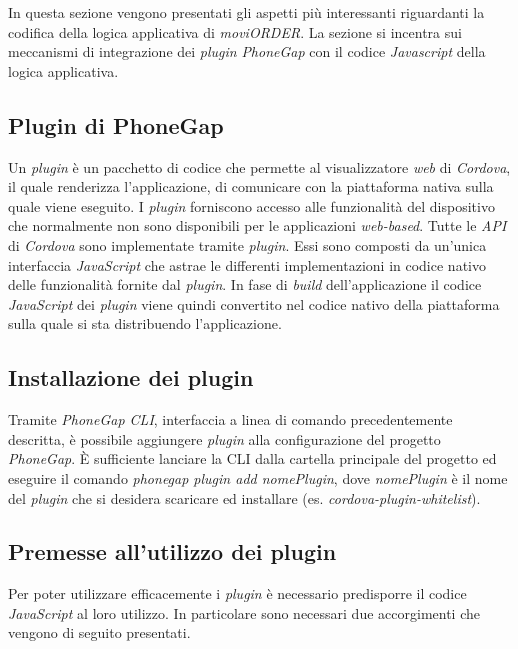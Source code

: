 In questa sezione vengono presentati gli aspetti più interessanti riguardanti la codifica della logica applicativa di \textit{moviORDER}. La sezione si incentra sui meccanismi di integrazione dei \textit{plugin} \textit{PhoneGap} con il codice \textit{Javascript} della logica applicativa.

\subsection{Plugin di PhoneGap}

Un \textit{plugin} è un pacchetto di codice che permette al visualizzatore \textit{web} di \textit{Cordova}, il quale renderizza l'applicazione, di comunicare con la piattaforma nativa sulla quale viene eseguito. I \textit{plugin} forniscono accesso alle funzionalità del dispositivo che normalmente non sono disponibili per le applicazioni \textit{web-based}. Tutte le \textit{API} di \textit{Cordova} sono implementate tramite \textit{plugin}. Essi sono composti da un'unica interfaccia \textit{JavaScript} che astrae le differenti implementazioni in codice nativo delle funzionalità fornite dal \textit{plugin}. In fase di \textit{build} dell'applicazione il codice \textit{JavaScript} dei \textit{plugin} viene quindi convertito nel codice nativo della piattaforma sulla quale si sta distribuendo l'applicazione.

\subsection{Installazione dei plugin}

Tramite \textit{PhoneGap CLI}, interfaccia a linea di comando precedentemente descritta, è possibile aggiungere \textit{plugin} alla configurazione del progetto \textit{PhoneGap}. È sufficiente lanciare la CLI dalla cartella principale del progetto ed eseguire il comando \textit{phonegap plugin add nomePlugin}, dove \textit{nomePlugin} è il nome del \textit{plugin} che si desidera scaricare ed installare (es. \textit{cordova-plugin-whitelist}).

\subsection{Premesse all'utilizzo dei plugin}

Per poter utilizzare efficacemente i \textit{plugin} è necessario predisporre il codice \textit{JavaScript} al loro utilizzo. In particolare sono necessari due accorgimenti che vengono di seguito presentati.

